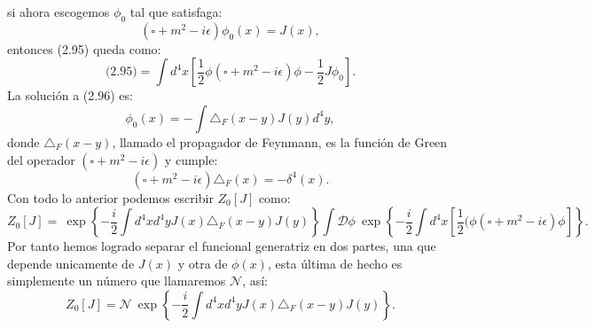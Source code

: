 si ahora escogemos $\phi_0$ tal que satisfaga:
\begin{equation}
(\square+m^2-i\epsilon)\phi_0(x)=J(x),
\end{equation}
entonces (2.95) queda como:
\begin{equation}
\text{(2.95)}=\int d^{4}x\left[\frac{1}{2}\phi(\square+m^{2}-i\epsilon)\phi-\frac{1}{2}J\phi_{0}\right].
\end{equation}
La solución a (2.96) es:
\begin{equation}
\phi_{0}(x)=-\int\triangle_{F}(x-y)J(y)d^{4}y ,
\end{equation}
donde $\triangle_F(x-y)$, llamado el propagador de Feynmann, es la función de Green del operador $(\square+m^2-i\epsilon)$ y cumple:
\begin{equation}
(\square+m^2-i\epsilon)\triangle_{F}(x)=-\delta^4(x).
\end{equation}
Con todo lo anterior podemos escribir $Z_0[J]$ como:
\begin{equation}
Z_0[J]=\ \exp\left\{ -\frac{i}{2}\int d^{4}xd^{4}yJ(x)\triangle_{F}(x-y)J(y)\right\} \int\mathcal{D}\phi\ \exp\left\{ -\frac{i}{2}\int d^{4}x\left[\frac{1}{2}(\phi(\square +m^{2}-i\epsilon)\phi\right]\right\} .
\end{equation}
Por tanto hemos logrado separar el funcional generatriz en dos partes, una que depende unicamente de $J(x)$ y otra de $\phi(x)$, esta última de hecho es simplemente un número que llamaremos $\mathcal{N}$, así:
\begin{equation}
Z_{0}[J]=\mathcal{N}\ \exp\left\{ -\frac{i}{2}\int d^{4}xd^{4}yJ(x)\triangle_{F}(x-y)J(y)\right\} .
\end{equation}
